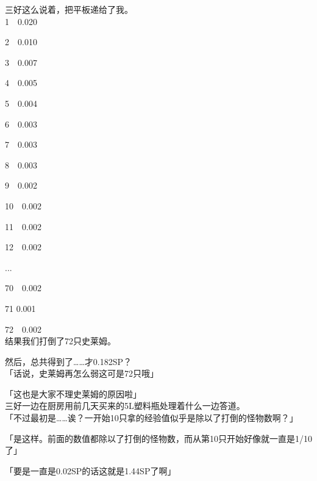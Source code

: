 三好这么说着，把平板递给了我。\\

 1　0.020

 2　0.010

 3　0.007

 4　0.005

 5　0.004

 6　0.003

 7　0.003

 8　0.003

 9　0.002

10　0.002

11　0.002

12　0.002

...

70　0.002

71  0.001

72　0.002\\

结果我们打倒了72只史莱姆。

然后，总共得到了……才0.182SP？\\

「话说，史莱姆再怎么弱这可是72只哦」

「这也是大家不理史莱姆的原因啦」\\

三好一边在厨房用前几天买来的5L塑料瓶处理着什么一边答道。\\

「不过最初是……诶？一开始10只拿的经验值似乎是除以了打倒的怪物数啊？」

「是这样。前面的数值都除以了打倒的怪物数，而从第10只开始好像就一直是1/10了」

「要是一直是0.02SP的话这就是1.44SP了啊」

